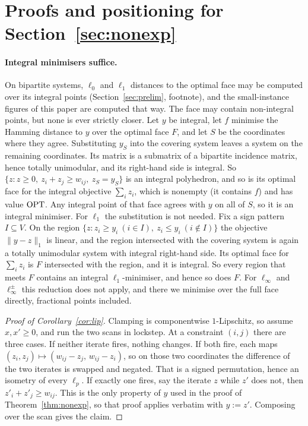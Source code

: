 
\section{Proofs and positioning for \texorpdfstring{Section~\ref{sec:nonexp}}{Section 3}}\label{app:early}

\paragraph{Integral minimisers suffice.} On bipartite systems, $\ell_0$ and $\ell_1$ distances to
the optimal face may be computed over its integral points (Section~\ref{sec:prelim}, footnote), and
the small-instance figures of this paper are computed that way. The face may contain non-integral
points, but none is ever strictly closer. Let $y$ be integral, let $f$ minimise the Hamming distance
to $y$ over the optimal face $F$, and let $S$ be the coordinates where they agree. Substituting
$y_S$ into the covering system leaves a system on the remaining coordinates. Its matrix is a
submatrix of a bipartite incidence matrix, hence totally unimodular, and its right-hand side is
integral. So $\{z : z \ge 0,\ z_i + z_j \ge w_{ij},\ z_S = y_S\}$ is an integral polyhedron, and
so is its optimal face for the integral objective $\sum_i z_i$, which is nonempty (it contains $f$)
and has value $\mathrm{OPT}$. Any integral point of that face agrees with $y$ on all of $S$, so it is an
integral minimiser. For $\ell_1$ the substitution is not needed. Fix a sign pattern
$I \subseteq V$. On the region $\{z : z_i \ge y_i\ (i \in I),\ z_i \le y_i\ (i \notin I)\}$ the
objective $\|y - z\|_1$ is linear, and the region intersected with the covering system is again a
totally unimodular system with integral right-hand side. Its optimal face for $\sum_i z_i$ is $F$
intersected with the region, and it is integral. So every region that meets $F$ contains an
integral $\ell_1$-minimiser, and hence so does $F$. For $\ell_\infty$ and $\ell_\infty^\pm$ this
reduction does not apply, and there we minimise over the full face directly, fractional points
included.

\begin{proof}[Proof of Corollary~\ref{cor:lip}]
Clamping is componentwise $1$-Lipschitz, so assume $x, x' \ge 0$, and run the two scans in
lockstep. At a constraint $(i,j)$ there are three cases. If neither iterate fires, nothing changes.
If both fire, each maps $(z_i, z_j) \mapsto (w_{ij} - z_j,\, w_{ij} - z_i)$, so on those two
coordinates the difference of the two iterates is swapped and negated. That is a signed
permutation, hence an isometry of every $\ell_p$. If exactly one fires, say the iterate $z$ while
$z'$ does not, then $z'_i + z'_j \ge w_{ij}$. This is the only property of $y$ used in the proof of
Theorem~\ref{thm:nonexp}, so that proof applies verbatim with $y := z'$. Composing over the scan
gives the claim.
\end{proof}

